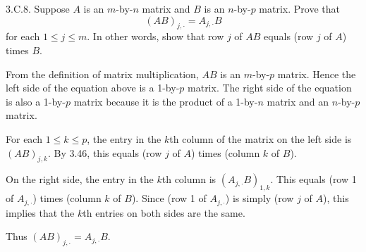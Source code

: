 \documentclass[a5paper]{article}
\begin{document}
\newcommand   \C           {\mathbf{C}}
\newcommand   \R           {\mathbf{R}}
\renewcommand \L           {\mathcal{L}}
\newcommand   \F           {\mathbf{F}}
\renewcommand \P           {\mathcal{P}}
\newcommand   \M           {\mathcal{M}}
\newcommand   \op          {\operatorname}

    3.C.8.
    Suppose $A$ is an $m$-by-$n$ matrix and $B$ is an $n$-by-$p$ matrix.
    Prove that
\begin{equation*}
        (AB)_{j,\cdot} = A_{j,\cdot} B
\end{equation*}
    for each $1 \le j \le m$.
    In other words, show that row $j$ of $AB$ equals (row $j$ of $A$) times $B$.

    From the definition of matrix multiplication, $AB$ is an $m$-by-$p$ matrix.
    Hence the left side of the equation above is a 1-by-$p$ matrix.
    The right side of the equation is also a 1-by-$p$ matrix because it is the product of a 1-by-$n$ matrix and an $n$-by-$p$ matrix.

    For each $1 \le k \le p$, the entry in the $k$th column of the matrix on the left side is $(AB)_{j,k}$.
    By 3.46, this equals (row $j$ of $A$) times (column $k$ of $B$).

    On the right side, the entry in the $k$th column is $(A_{j,\cdot}B)_{1,k}$.
    This equals (row 1 of $A_{j,\cdot}$) times (column $k$ of $B$).
    Since (row 1 of $A_{j,\cdot}$) is simply (row $j$ of $A$), this implies that the $k$th entries on both sides are the same.

    Thus $(AB)_{j,\cdot}=A_{j,\cdot}B$.
\end{document}
